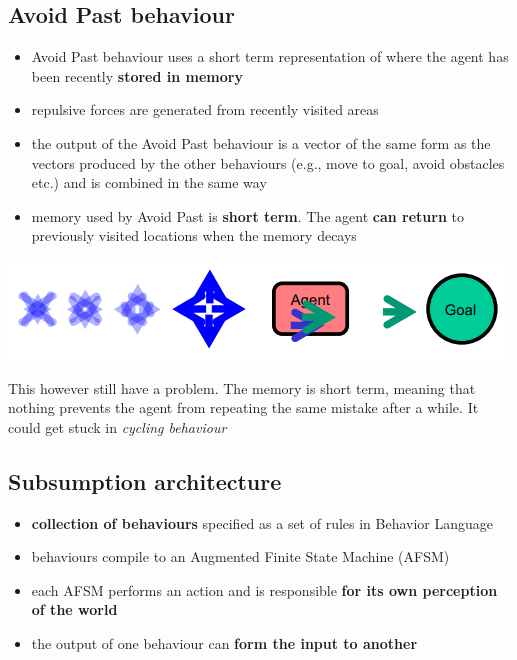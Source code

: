 \documentclass{article}
\begin{document}
\subsection{Avoid Past behaviour}
\begin{itemize}
  \item Avoid Past behaviour uses a short term representation of where the agent has been recently \textbf{stored in memory}
  \item repulsive forces are generated from recently visited areas 
  \item the output of the Avoid Past behaviour is a vector of the same form as the vectors produced by the other behaviours (e.g., move to goal, avoid obstacles etc.) and is combined in the same way 
  \item memory used by Avoid Past is \textbf{short term}. The agent \textbf{can return} to previously visited locations when the memory decays
\end{itemize}
\begin{center}
  \includegraphics[scale=0.5]{avoid_past.png}
\end{center}
\begin{flushleft}
This however still have a problem. The memory is short term, meaning that nothing prevents the agent from repeating the same mistake after a while. It could get stuck in \textit{cycling behaviour}
\end{flushleft}

\subsection{Subsumption architecture}

\begin{itemize}
  \item \textbf{collection of behaviours} specified as a set of rules in Behavior Language 
  \item behaviours compile to an Augmented Finite State Machine (AFSM) 
  \item each AFSM performs an action and is responsible \textbf{for its own perception of the world}
  \item the output of one behaviour can \textbf{form the input to another}
\end{itemize}
\end{document}
